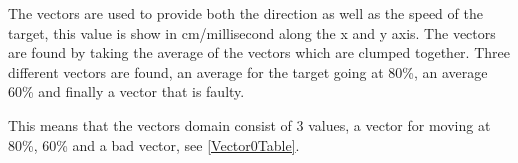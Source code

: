 % 

The vectors are used to provide both the direction as well as the speed of the
target, this value is show in cm/millisecond along the x and y axis. The
vectors are found by taking the average of the vectors which are clumped
together. Three different vectors are found, an average for the target going at
80\%, an average 60\% and finally a vector that is faulty.

This means that the vectors domain consist of 3 values, a vector for moving
at 80\%, 60\% and a bad vector, see \autoref{Vector0Table}. 

